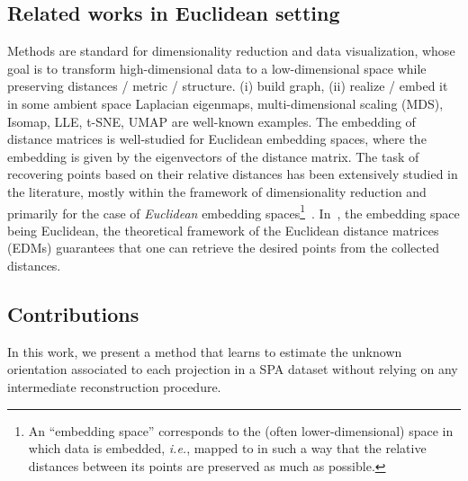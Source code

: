 
\subsection{Related works in Euclidean setting}

 Methods are standard for dimensionality reduction and data visualization, whose goal is to transform high-dimensional data to a low-dimensional space while preserving distances / metric / structure.
(i) build graph, (ii) realize / embed it in some ambient space
Laplacian eigenmaps, multi-dimensional scaling (MDS), Isomap, LLE, t-SNE, UMAP are well-known examples.
The embedding of distance matrices is well-studied for Euclidean embedding spaces, where the embedding is given by the eigenvectors of the distance matrix.
The task of recovering points based on their relative distances has been extensively studied in the literature, mostly within the framework of dimensionality reduction and primarily for the case of \textit{Euclidean} embedding spaces\footnote{An ``embedding space'' corresponds to the (often lower-dimensional) space in which data is embedded, \textit{i.e.}, mapped to in such a way that the relative distances between its points are preserved as much as possible.}~\cite{belkin2003laplacian,kruskal1978multidimensional, maaten2008visualizing, mcinnes2018umap,dokmanic2015euclidean}.
In~\cite{dokmanic2015euclidean}, the embedding space being Euclidean, the theoretical framework of the Euclidean distance matrices (EDMs) guarantees that one can retrieve the desired points from the collected distances.


\subsection{Contributions}


In this work, we present a method that learns to estimate the unknown orientation associated to each projection in a SPA dataset without relying on any intermediate reconstruction procedure.
